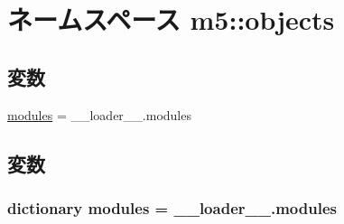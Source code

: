 \hypertarget{namespacem5_1_1objects}{
\section{ネームスペース m5::objects}
\label{namespacem5_1_1objects}
}
\subsection*{変数}
\begin{DoxyCompactItemize}
\item 
\hyperlink{namespacem5_1_1objects_a0747857286993d5b56864aa1248e7bf3}{modules} = \_\-\_\-loader\_\-\_\-.modules
\end{DoxyCompactItemize}


\subsection{変数}
\hypertarget{namespacem5_1_1objects_a0747857286993d5b56864aa1248e7bf3}{
\subsubsection[{modules}]{\setlength{\rightskip}{0pt plus 5cm}dictionary {\bf modules} = \_\-\_\-loader\_\-\_\-.modules}}
\label{namespacem5_1_1objects_a0747857286993d5b56864aa1248e7bf3}
